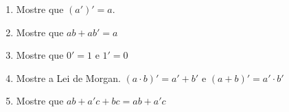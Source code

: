 \documentclass[oneside,a4paper,12pt]{article}
\begin{document}
\begin{enumerate}
	\item Mostre que $(a')' = a$.
	
	\item Mostre que $ab + ab' = a$
	
	\item Mostre que $0' = 1$ e $1' = 0$
	
	\item Mostre a Lei de Morgan. $(a \cdot b)' = a' + b'$ e $(a + b)' = a' \cdot b'$
	
	\item Mostre que $ab + a'c + bc = ab + a'c$
	
	











\end{enumerate}


	
\end{document}
